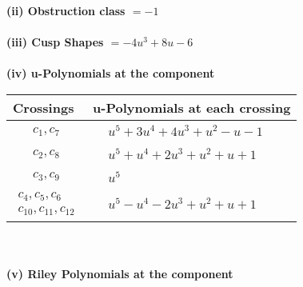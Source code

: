 \documentclass[1p]{elsarticle_modified}
\theoremstyle{definition}
\begin{document}
\flushleft \textbf{(ii) Obstruction class $= -1$}\\~\\
\flushleft \textbf{(iii) Cusp Shapes $= -4 u^3+8 u-6$}\\~\\
\newpage\renewcommand{\arraystretch}{1}
\flushleft \textbf{(iv) u-Polynomials at the component}\newline \\
\begin{tabular}{m{50pt}|m{274pt}}
Crossings & \hspace{64pt}u-Polynomials at each crossing \\
\hline $$\begin{aligned}c_{1},c_{7}\end{aligned}$$&$\begin{aligned}
&u^5+3 u^4+4 u^3+u^2- u-1
\end{aligned}$\\
\hline $$\begin{aligned}c_{2},c_{8}\end{aligned}$$&$\begin{aligned}
&u^5+u^4+2 u^3+u^2+u+1
\end{aligned}$\\
\hline $$\begin{aligned}c_{3},c_{9}\end{aligned}$$&$\begin{aligned}
&u^5
\end{aligned}$\\
\hline $$\begin{aligned}c_{4},c_{5},c_{6}\\c_{10},c_{11},c_{12}\end{aligned}$$&$\begin{aligned}
&u^5- u^4-2 u^3+u^2+u+1
\end{aligned}$\\
\hline
\end{tabular}\\~\\
\newpage\renewcommand{\arraystretch}{1}
\flushleft \textbf{(v) Riley Polynomials at the component}\newline \\
\end{document}

